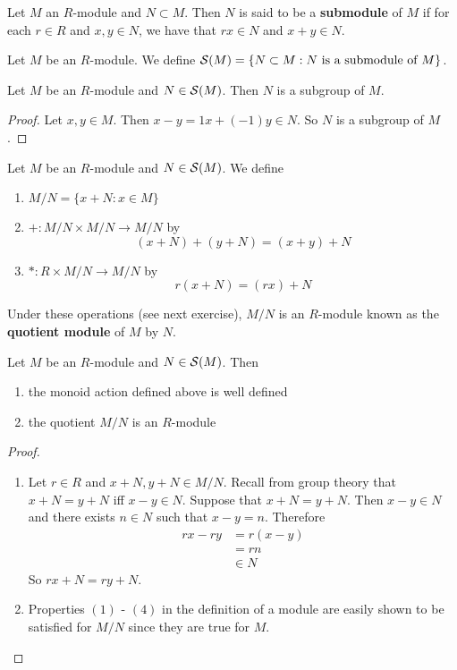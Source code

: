 \documentclass{book}
\begin{document}
	\begin{defn}
	Let $M$ an $R$-module and $N \subset M$. Then $N$ is said to be a \textbf{submodule} of $M$ if for each $r \in R$ and $x,y \in N$, we have that $rx \in N$ and $x+y \in N$.
	\end{defn}
	
	\begin{defn}
	Let $M$ be an $R$-module. We define $\mathcal{S}(M) = \{N \subset M: N \text{ is a submodule of }M\}$.
	\end{defn}	
	
	\begin{ex}
	Let $M$ be an $R$-module and $N \in \mathcal{S}(M)$. Then $N$ is a subgroup of $M$.
	\end{ex}
	
	\begin{proof}
	Let $x,y \in M$. Then $x-y = 1x + (-1)y \in N$. So $N$ is a subgroup of $M$.
	\end{proof}
	
	\begin{defn}
	Let $M$ be an $R$-module and $N \in \mathcal{S}(M)$. We define  
	\begin{enumerate}
	\item $M/N = \{x + N: x \in M\}$ 
	\item $+: M/N \times M/N \rightarrow M/N$ by $$(x+N) + (y+N) = (x+y) + N$$
	\item $*: R \times M/N \rightarrow M/N$ by $$r(x+N) = (rx) + N$$
	\end{enumerate}
	Under these operations (see next exercise), $M/N$ is an $R$-module known as the \textbf{quotient module} of $M$ by $N$.
	\end{defn}	
	
	\begin{ex} 
	Let $M$ be an $R$-module and $N \in \mathcal{S}(M)$. Then
	\begin{enumerate}
	\item the monoid action defined above is well defined
	\item the quotient $M/N$ is an $R$-module
	\end{enumerate}
	\end{ex}
	
	\begin{proof}\
	\begin{enumerate}
	\item Let $r \in R$ and $x +N, y +N \in M/N $. Recall from group theory that $x + N = y + N$ iff $x-y \in N$. Suppose that $x + N = y + N$. Then $x - y \in N$ and there exists $n \in N$ such that $x-y = n$. Therefore
	\begin{align*}
	rx - ry 
	&= r(x-y) \\
	&= rn \\
	&\in N
	\end{align*}
	So $rx + N = ry + N$.
	\item Properties $(1)$ - $(4)$ in the definition of a module are easily shown to be satisfied for $M/N$ since they are true for $M$.
	\end{enumerate}
	\end{proof}
	
\end{document}
